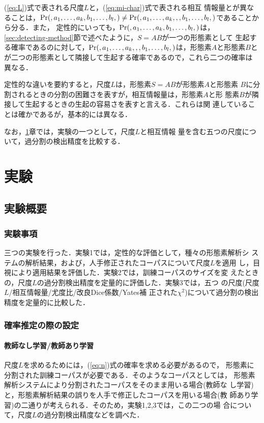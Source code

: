 (\ref{eq:L})式で表される尺度$L$と，(\ref{eq:mi-char})式で表される相互
情報量とが異なることは，$\Pr(,a_1,\ldots,a_k,b_1,\ldots,b_l,) \ne
\Pr(,a_1,\ldots,a_k,,,b_1,\ldots,b_l,)$であることから分る．また，
定性的にいっても，$\Pr(,a_1,\ldots,a_k,b_1,\ldots,b_l,)$は，
\ref{sec:detecting-method}節で述べたように，$S=AB$が一つの形態素として
生起する確率であるのに対して，$\Pr(,a_1,\ldots,a_k,,,b_1,\ldots,b_l,)$は，形態素$A$と形態素$B$と
が二つの形態素として隣接して生起する確率であるので，これら二つの確率は
異なる．

定性的な違いを要約すると，尺度$L$は，形態素$S=AB$が形態素$A$と形態素
$B$に分割されるときの分割の困難さを表すが，相互情報量は，形態素$A$と形
態素$B$が隣接して生起するときの生起の容易さを表すと言える．これらは関
連していることは確かであるが，基本的には異なる．

なお，\ref{sec:experiments}章では，実験の一つとして，尺度$L$と相互情報
量を含む五つの尺度について，過分割の検出精度を比較する．

\section{実験}
\label{sec:experiments}

\subsection{実験概要}
\label{sec:overview}

\subsubsection*{実験事項}

三つの実験を行った．実験1では，定性的な評価として，種々の形態素解析シ
ステムの解析結果，および，人手修正されたコーパスについて尺度$L$を適用
し，目視により適用結果を評価した．実験2では，訓練コーパスのサイズを変
えたときの，尺度$L$の過分割検出精度を定量的に評価した．実験3では，五つ
の尺度(尺度$L$/相互情報量/尤度比/改良Dice係数\cite{kitamura97}/Yates補
正された$\chi^2$)について過分割の検出精度を定量的に比較した．

\subsubsection*{確率推定の際の設定}

\paragraph{教師なし学習/教師あり学習}
尺度$L$を求めるためには，(\ref{eq:n})式の確率を求める必要があるので，
形態素に分割された訓練コーパスが必要である．そのようなコーパスとしては，
形態素解析システムにより分割されたコーパスをそのまま用いる場合(教師な
し学習)と，形態素解析結果の誤りを人手で修正したコーパスを用いる場合(教
師あり学習)の二通りが考えられる．そのため，実験1,2,3では，この二つの場
合について，尺度$L$の過分割検出精度などを調べた．

